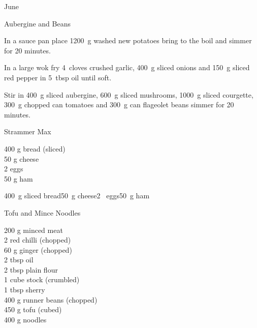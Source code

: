 \begin{menu}{June}
\begin{recipe}{2}{Aubergine and Beans}
    \begin{instructions}
    \item 
      In a sauce pan place
      1200~g washed new potatoes
      bring to the boil and simmer for 20 minutes.
    \item 
        In a large wok fry
        4~cloves crushed garlic,
        400~g sliced onions
        and
        150~g sliced red pepper
        in
        5~tbsp  oil
        until soft.
      \item 
        Stir in
        400~g sliced aubergine,
        600~g sliced mushrooms,
        1000~g sliced courgette,
        300~g chopped can tomatoes
        and
        300~g  can flageolet beans
        simmer for 20 minutes.
      
    \end{instructions}
    \end{recipe}%
  
    \begin{recipe}{1}{Strammer Max}%
		\begin{ingredients}
		400 g bread (sliced) \\
	50 g cheese  \\
	2  eggs  \\
	50 g ham  \\
	
		\end{ingredients}
	
    \begin{instructions}
    \item 400~g sliced bread50~g  cheese2~  eggs50~g  ham
    \end{instructions}
    \end{recipe}%
  
    \begin{recipe}{2}{Tofu and Mince Noodles}%
		\begin{ingredients}
		200 g minced meat  \\
	2  red chilli (chopped) \\
	60 g ginger (chopped) \\
	2 tbsp oil  \\
	2 tbsp plain flour  \\
	1 cube stock (crumbled) \\
	1 tbsp sherry  \\
	400 g runner beans (chopped) \\
	450 g tofu (cubed) \\
	400 g noodles  \\
	

\end{ingredients}
\end{recipe}
\end{menu}
